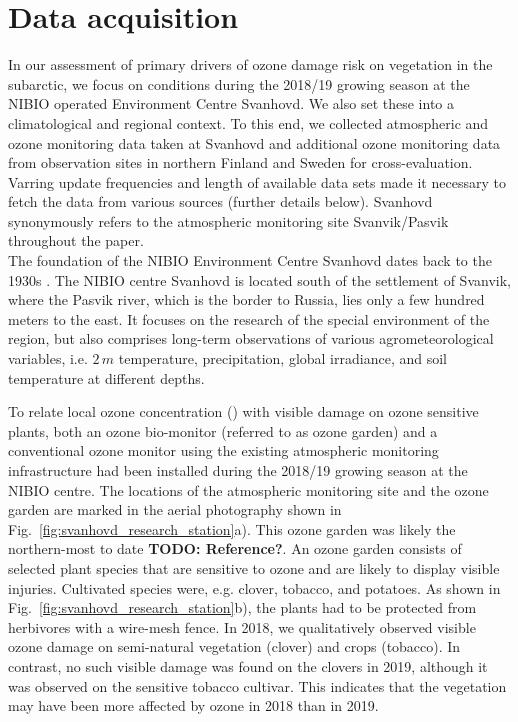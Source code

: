 \documentclass[bg, manuscript]{copernicus}
\begin{document}
\section{Data acquisition}
\label{sec:data}

In our assessment of primary drivers of ozone damage risk on vegetation in the subarctic, we focus on conditions during the 2018/19 growing season at the NIBIO operated Environment Centre Svanhovd. We also set these into a climatological and regional context. To this end, we collected atmospheric and ozone monitoring data taken at Svanhovd and additional ozone monitoring data from observation sites in northern Finland and Sweden for cross-evaluation. Varring update frequencies and length of available data sets made it necessary to fetch the data from various sources (further details below). Svanhovd synonymously refers to the atmospheric monitoring site Svanvik/Pasvik throughout the paper.\\

The foundation of the NIBIO Environment Centre Svanhovd dates back to the 1930s \citep{NIBIO_Svanhovd}. The NIBIO centre Svanhovd is located south of the settlement of Svanvik, where the Pasvik river, which is the border to Russia, lies only a few hundred meters to the east. It focuses on the research of the special environment of the region, but also comprises long-term observations of various agrometeorological variables, i.e. $2\,\unit{m}$ temperature, precipitation, global irradiance, and soil temperature at different depths.

To relate local ozone concentration (\chem{[O_3]}) with visible damage on ozone sensitive plants, both an ozone bio-monitor (referred to as ozone garden) and a conventional ozone monitor using the existing atmospheric monitoring infrastructure had been installed during the 2018/19 growing season at the NIBIO centre. The locations of the atmospheric monitoring site and the ozone garden are marked in the aerial photography shown in Fig.~\ref{fig:svanhovd_research_station}a). This ozone garden was likely the northern-most to date {\bf TODO: Reference?}. An ozone garden consists of selected plant species that are sensitive to ozone and are likely to display visible injuries. Cultivated species were, e.g. clover, tobacco, and potatoes. As shown in Fig.~\ref{fig:svanhovd_research_station}b), the plants had to be protected from herbivores with a wire-mesh fence. In 2018, we qualitatively observed visible ozone damage on semi-natural vegetation (clover) and crops (tobacco). In contrast, no such visible damage was found on the clovers in 2019, although it was observed on the sensitive tobacco cultivar. This indicates that the vegetation may have been more affected by ozone in 2018 than in 2019.
\end{document}
